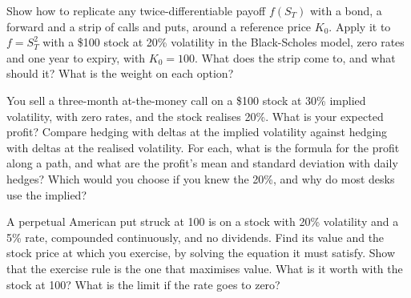 \begin{question}\label{iq:iv2:options-parity-and-greeks:48}
Show how to replicate any twice-differentiable payoff $f(S_T)$ with a bond, a forward and a strip of calls and puts, around a reference price $K_0$. Apply it to $f = S_T^2$ with a \$100 stock at 20\% volatility in the Black-Scholes model, zero rates and one year to expiry, with $K_0 = 100$. What does the strip come to, and what should it? What is the weight on each option?
\end{question}

\begin{question}\label{iq:iv2:options-parity-and-greeks:49}
You sell a three-month at-the-money call on a \$100 stock at 30\% implied volatility, with zero rates, and the stock realises 20\%. What is your expected profit? Compare hedging with deltas at the implied volatility against hedging with deltas at the realised volatility. For each, what is the formula for the profit along a path, and what are the profit's mean and standard deviation with daily hedges? Which would you choose if you knew the 20\%, and why do most desks use the implied?
\end{question}

\begin{question}\label{iq:iv2:options-parity-and-greeks:50}
A perpetual American put struck at 100 is on a stock with 20\% volatility and a 5\% rate, compounded continuously, and no dividends. Find its value and the stock price at which you exercise, by solving the equation it must satisfy. Show that the exercise rule is the one that maximises value. What is it worth with the stock at 100? What is the limit if the rate goes to zero?
\end{question}
